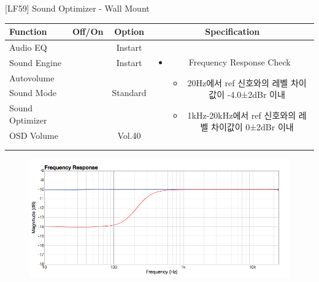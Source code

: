 \begin{frame}[t]{[LF59] Sound Optimizer - Wall Mount}
\begin{tiny}
\begin{tabular}{@{}lccc@{}}
\toprule
Function & Off/On & Option & Specification \\
\midrule
Audio EQ & \color{black}{Off} & Instart &
\multirow{8}{60mm}{
\begin{itemize}
\item Frequency Response Check
	\begin{itemize}
	\item 20Hz에서 ref 신호와의 레벨 차이값이 -4.0±2dBr 이내
	\item 1kHz-20kHz에서 ref 신호와의 레벨 차이값이 0±2dBr 이내
	\end{itemize}
\end{itemize}
} \\
Sound Engine & \color{blue}{On} & Instart & \\
Autovolume & \color{black}{Off} & & \\
Sound Mode & \color{blue}{On} & Standard & \\
Sound Optimizer & \color{blue}{On} & \color{blue}{Wallmount} & \\
OSD Volume & \color{blue}{On} & Vol.40 & \\
 & & & \\
 & & & \\
\midrule
\end{tabular}
\end{tiny}

\begin{figure}[b]
\includegraphics[height=0.4\textwidth]{figures/wallmount.png}
\end{figure}

\end{frame}

